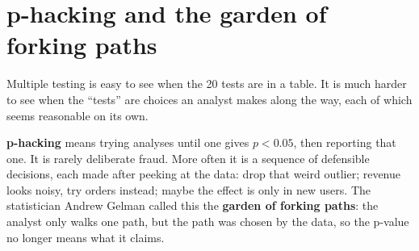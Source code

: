 \section{p-hacking and the garden of forking paths}
\label{sec:pitfalls-phacking}

Multiple testing is easy to see when the 20 tests are in a table. It is much
harder to see when the ``tests'' are choices an analyst makes along the way, each
of which seems reasonable on its own.

\textbf{p-hacking} means trying analyses until one gives $p<0.05$, then
reporting that one. It is rarely deliberate fraud. More often it is a sequence of
defensible decisions, each made after peeking at the data: drop that weird
outlier; revenue looks noisy, try orders instead; maybe the effect is only in new
users. The statistician Andrew Gelman called this the \textbf{garden of forking
paths}: the analyst only walks one path, but the path was chosen by the data, so
the p-value no longer means what it claims.

